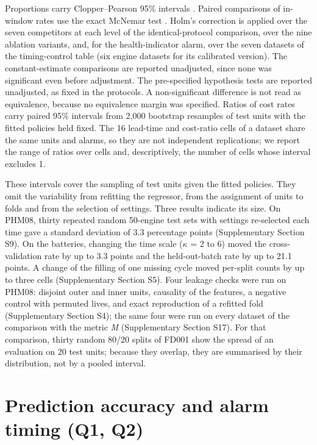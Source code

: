 \documentclass[a4paper,fleqn,doubleblind]{cas-dc}
\begin{document}
Proportions carry Clopper--Pearson 95\% intervals \cite{clopper1934}. Paired comparisons of in-window rates use the exact McNemar test \cite{mcnemar1947}. Holm's correction \cite{holm1979} is applied over the seven competitors at each level of the identical-protocol comparison, over the nine ablation variants, and, for the health-indicator alarm, over the seven datasets of the timing-control table (six engine datasets for its calibrated version). The constant-estimate comparisons are reported unadjusted, since none was significant even before adjustment. The pre-specified hypothesis tests are reported unadjusted, as fixed in the protocols. A non-significant difference is not read as equivalence, because no equivalence margin was specified. Ratios of cost rates carry paired 95\% intervals from 2,000 bootstrap resamples of test units with the fitted policies held fixed. The 16 lead-time and cost-ratio cells of a dataset share the same units and alarms, so they are not independent replications; we report the range of ratios over cells and, descriptively, the number of cells whose interval excludes 1.

These intervals cover the sampling of test units given the fitted policies. They omit the variability from refitting the regressor, from the assignment of units to folds and from the selection of settings. Three results indicate its size. On PHM08, thirty repeated random 50-engine test sets with settings re-selected each time gave a standard deviation of 3.3 percentage points (Supplementary Section S9). On the batteries, changing the time scale ($\kappa$ = 2 to 6) moved the cross-validation rate by up to 3.3 points and the held-out-batch rate by up to 21.1 points. A change of the filling of one missing cycle moved per-split counts by up to three cells (Supplementary Section S5). Four leakage checks were run on PHM08: disjoint outer and inner units, causality of the features, a negative control with permuted lives, and exact reproduction of a refitted fold (Supplementary Section S4); the same four were run on every dataset of the comparison with the metric \textit{M} (Supplementary Section S17). For that comparison, thirty random 80/20 splits of FD001 show the spread of an evaluation on 20 test units; because they overlap, they are summarised by their distribution, not by a pooled interval.

\section{Prediction accuracy and alarm timing (Q1, Q2)}\label{sec:6}
\end{document}
